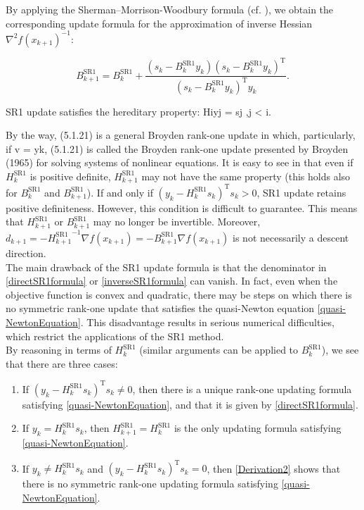 By applying the Sherman–Morrison-Woodbury formula (cf. ), we obtain the corresponding update formula for the approximation of inverse Hessian ${\nabla^{2} f(x_{k+1})}^{-1}$:

\begin{equation}\label{inverseSR1formula}
    B^\mathrm{SR1}_{k+1} = B^\mathrm{SR1}_k + \frac{(s_k - B^\mathrm{SR1}_k y_k) (s_k - B^\mathrm{SR1}_k y_k)^{\mathrm{T}}}{(s_k - B^\mathrm{SR1}_k y_k)^{\mathrm{T}} y_k}.
\end{equation}

SR1 update satisfies the hereditary property: Hiyj = sj ,j < i.

By the way, (5.1.21) is a general Broyden rank-one update in which, particularly, if v = yk, (5.1.21) is called the Broyden rank-one update presented
by Broyden (1965) for solving systems of nonlinear equations.
It is easy to see in that even if $H^\mathrm{SR1}_k$ is positive definite, $H^\mathrm{SR1}_{k+1}$ may not have the same property (this holds also for $B^\mathrm{SR1}_k$ and $B^\mathrm{SR1}_{k+1}$). If and only if $(y_k - H^\mathrm{SR1}_k s_k)^{\mathrm{T}} s_k > 0$, SR1 update retains positive definiteness. However, this condition is difficult to guarantee. This means that $H^\mathrm{SR1}_{k+1}$ or $B^\mathrm{SR1}_{k+1}$ may no longer be invertible. Moreover, $d_{k+1} = -{H^\mathrm{SR1}_{k+1}}^{-1} \nabla f(x_{k+1}) = -B^\mathrm{SR1}_{k+1} \nabla f(x_{k+1})$ is not necessarily a descent direction. \\
The main drawback of the SR1 update formula is that the denominator in \cref{directSR1formula} or \cref{inverseSR1formula} can vanish. In fact, even when the objective function is convex and quadratic, there may be steps on which there is no symmetric rank-one update that satisfies the quasi-Newton equation \cref{quasi-NewtonEquation}. This disadvantage results in serious numerical difficulties, which restrict the applications of the SR1 method. \\ 
By reasoning in terms of $H^\mathrm{SR1}_k$ (similar arguments can be applied to $B^\mathrm{SR1}_k$), we see that there are three cases:

\begin{enumerate}
    \item If $(y_k - H^\mathrm{SR1}_k s_k)^{\mathrm{T}} s_k \neq 0$, then there is a unique rank-one updating formula satisfying \cref{quasi-NewtonEquation}, and that it is given by \cref{directSR1formula}.
    \item If $y_k = H^\mathrm{SR1}_k s_k$, then $H^\mathrm{SR1}_{k+1} = H^\mathrm{SR1}_k$ is the only updating formula satisfying \cref{quasi-NewtonEquation}.
    \item If $y_k \neq H^\mathrm{SR1}_k s_k$ and $(y_k - H^\mathrm{SR1}_k s_k)^{\mathrm{T}} s_k = 0$, then \cref{Derivation2} shows that there is no symmetric rank-one updating formula satisfying \cref{quasi-NewtonEquation}.
\end{enumerate}

